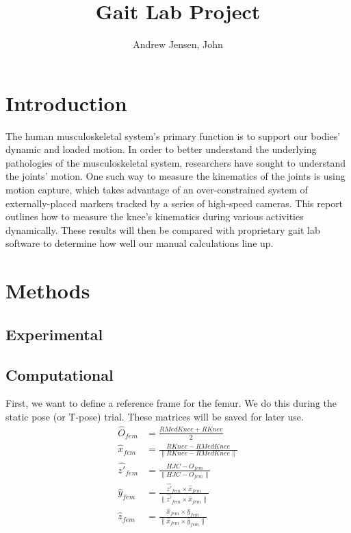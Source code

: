 \documentclass{IEEEtran}
\title{Gait Lab Project}
\author{Andrew Jensen, John}
\begin{document}
\maketitle
    \section{Introduction}
    The human musculoskeletal system's primary function is to support our bodies' dynamic and loaded motion. In order to better understand the underlying pathologies of the musculoskeletal system, researchers have sought to understand the joints' motion. One such way to measure the kinematics of the joints is using motion capture, which takes advantage of an over-constrained system of externally-placed markers tracked by a series of high-speed cameras. This report outlines how to measure the knee's kinematics during various activities dynamically. These results will then be compared with proprietary gait lab software to determine how well our manual calculations line up.

    \section{Methods}
    \subsection{Experimental}
    \subsection{Computational}
    First, we want to define a reference frame for the femur. We do this during the static pose (or T-pose) trial. These matrices will be saved for later use.
\begin{equation}
    \begin{aligned}
        \hat{O}_{fem} &= \frac{RMedKnee + RKnee}{2}\\
        \hat{x}_{fem} & = \frac{RKnee - RMedKnee}{\|RKnee - RMedKnee\|} \\
        \hat{z'}_{fem} &= \frac{HJC - O_{fem}}{\|HJC - O_{fem}\|} \\
        \hat{y}_{fem} &= \frac{\hat{z'}_{fem} \times \hat{x}_{fem}}{\|\hat{z'}_{fem} \times \hat{x}_{fem}\|} \\
        \hat{z}_{fem} & = \frac{\hat{x}_{fem} \times \hat{y}_{fem}}{\|\hat{x}_{fem} \times \hat{y}_{fem}\|}
    \end{aligned}
    \label{fem_rf}
\end{equation}
    
\end{document}
